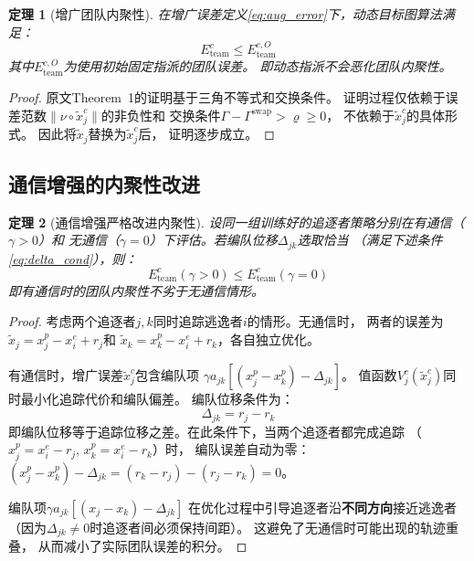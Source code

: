 \documentclass[11pt,a4paper]{article}
\newtheorem{theorem}{定理}
\begin{document}
\begin{theorem}[增广团队内聚性]\label{thm:cohesion}
  在增广误差定义\eqref{eq:aug_error}下，动态目标图算法满足：
  \begin{equation}\label{eq:cohesion_bound}
    E_{\mathrm{team}}^c \leq E_{\mathrm{team}}^{c,O}
  \end{equation}
  其中$E_{\mathrm{team}}^{c,O}$为使用初始固定指派的团队误差。
  即动态指派不会恶化团队内聚性。
\end{theorem}

\begin{proof}
  原文Theorem~1的证明基于三角不等式和交换条件。
  证明过程仅依赖于误差范数$\|\nu \circ \tilde{x}_j^c\|$的非负性和
  交换条件$\Gamma - \Gamma^{\text{swap}} > \varrho \geq 0$，
  不依赖于$\tilde{x}_j^c$的具体形式。
  因此将$\tilde{x}_j$替换为$\tilde{x}_j^c$后，
  证明逐步成立。
\end{proof}


\subsection{通信增强的内聚性改进}

\begin{theorem}[通信增强严格改进内聚性]\label{thm:comm_improve}
  设同一组训练好的追逐者策略分别在有通信（$\gamma > 0$）和
  无通信（$\gamma = 0$）下评估。若编队位移$\Delta_{jk}$选取恰当
  （满足下述条件\eqref{eq:delta_cond}），则：
  \begin{equation}\label{eq:strict_improve}
    E_{\mathrm{team}}^{c}(\gamma > 0) \leq
    E_{\mathrm{team}}^{c}(\gamma = 0)
  \end{equation}
  即有通信时的团队内聚性不劣于无通信情形。
\end{theorem}

\begin{proof}
  考虑两个追逐者$j, k$同时追踪逃逸者$i$的情形。无通信时，
  两者的误差为$\tilde{x}_j = x_j^p - x_i^e + r_j$和
  $\tilde{x}_k = x_k^p - x_i^e + r_k$，各自独立优化。

  有通信时，增广误差$\tilde{x}_j^c$包含编队项
  $\gamma a_{jk}[(x_j^p - x_k^p) - \Delta_{jk}]$。
  值函数$V_j^c(\tilde{x}_j^c)$同时最小化追踪代价和编队偏差。
  编队位移条件为：
  \begin{equation}\label{eq:delta_cond}
    \Delta_{jk} = r_j - r_k
  \end{equation}
  即编队位移等于追踪位移之差。在此条件下，当两个追逐者都完成追踪
  （$x_j^p = x_i^e - r_j$, $x_k^p = x_i^e - r_k$）时，
  编队误差自动为零：$(x_j^p - x_k^p) - \Delta_{jk} = (r_k - r_j) - (r_j - r_k) = 0$。

  编队项$\gamma a_{jk}[(x_j - x_k) - \Delta_{jk}]$
  在优化过程中引导追逐者沿\textbf{不同方向}接近逃逸者
  （因为$\Delta_{jk} \neq 0$时追逐者间必须保持间距）。
  这避免了无通信时可能出现的轨迹重叠，
  从而减小了实际团队误差的积分。
\end{proof}
\end{document}
